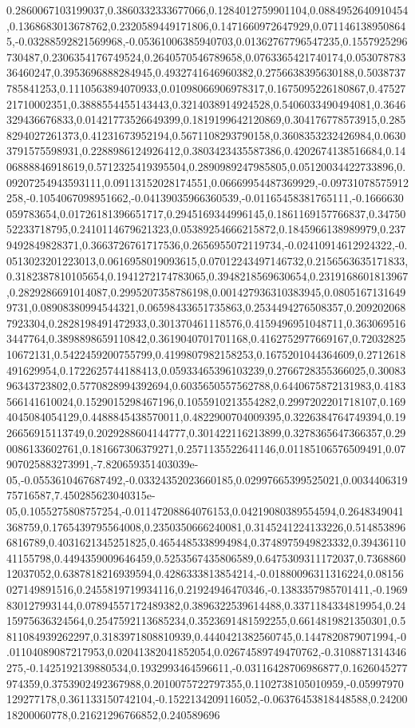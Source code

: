 0.2860067103199037,0.3860332333677066,0.1284012759901104,0.0884952640910454,0.1368683013678762,0.2320589449171806,0.1471660972647929,0.0711461389508645,-0.03288592821569968,-0.05361006385940703,0.01362767796547235,0.1557925296730487,0.2306354176749524,0.2640570546789658,0.0763365421740174,0.05307878336460247,0.3953696888284945,0.4932741646960382,0.2756638395630188,0.5038737785841253,0.1110563894070933,0.01098066906978317,0.1675095226180867,0.4752721710002351,0.3888554455143443,0.3214038914924528,0.5406033490494081,0.3646329436676833,0.01421773526649399,0.1819199642120869,0.304176778573915,0.2858294027261373,0.41231673952194,0.5671108293790158,0.3608353232426984,0.06303791575598931,0.2288986124926412,0.3803423435587386,0.4202674138516684,0.1406888846918619,0.5712325419395504,0.2890989247985805,0.05120034422733896,0.09207254943593111,0.09113152028174551,0.06669954487369929,-0.09731078575912258,-0.1054067098951662,-0.04139035966360539,-0.01165458381765111,-0.1666630059783654,0.01726181396651717,0.2945169344996145,0.1861169157766837,0.3475052233718795,0.2410114679621323,0.05389254666215872,0.1845966138989979,0.2379492849828371,0.3663726761717536,0.2656955072119734,-0.02410914612924322,-0.0513023201223013,0.0616958019093615,0.07012243497146732,0.2156563635171833,0.3182387810105654,0.1941272174783065,0.3948218569630654,0.2319168601813967,0.2829286691014087,0.2995207358786198,0.001427936310383945,0.08051671316499731,0.08908380994544321,0.06598433651735863,0.2534494276508357,0.2092020687923304,0.2828198491472933,0.301370461118576,0.4159496951048711,0.3630695163447764,0.3898898659110842,0.3619040701701168,0.4162752977669167,0.7203282510672131,0.5422459200755799,0.4199807982158253,0.1675201044364609,0.2712618491629954,0.1722625744188413,0.05933465396103239,0.2766728355366025,0.3008396343723802,0.5770828994392694,0.6035650557562788,0.6440675872131983,0.4183566141610024,0.1529015298467196,0.1055910213554282,0.2997202201718107,0.1694045084054129,0.4488845438570011,0.4822900704009395,0.3226384764749394,0.1926656915113749,0.2029288604144777,0.301422116213899,0.3278365647366357,0.290086133602761,0.181667306379271,0.2571135522641146,0.01185106576509491,0.07907025883273991,-7.820659351403039e-05,-0.0553610467687492,-0.03324352023660185,0.02997665399525021,0.003440631975716587,7.450285623040315e-05,0.1055275808757254,-0.01147208864076153,0.04219080389554594,0.2648349041368759,0.1765439795564008,0.2350350666240081,0.3145241224133226,0.5148538966816789,0.4031621345251825,0.4654485338994984,0.3748975949823332,0.3943611041155798,0.4494359009646459,0.5253567435806589,0.6475309311172037,0.736886012037052,0.6387818216939594,0.4286333813854214,-0.01880096311316224,0.08156027149891516,0.2455819719934116,0.21924946470346,-0.1383357985701411,-0.1969830127993144,0.07894557172489382,0.3896322539614488,0.3371184334819954,0.2415975636324564,0.2547592113685234,0.3523691481592255,0.6614819821350301,0.5811084939262297,0.3183971808810939,0.4440421382560745,0.1447820879071994,-0.01104089087217953,0.02041382041852054,0.02674589749470762,-0.3108871314346275,-0.1425192139880534,0.1932993464596611,-0.03116428706986877,0.1626045277974359,0.3753902492367988,0.2010075722797355,0.1102738105010959,-0.05997970129277178,0.361133150742104,-0.1522134209116052,-0.06376453818448588,0.2420018200060778,0.21621296766852,0.240589696